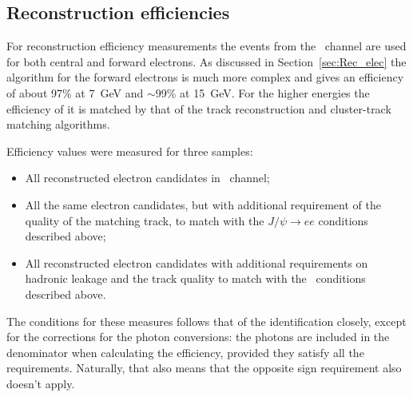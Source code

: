 \begin{figure}
\end{figure}


\subsection{Reconstruction efficiencies}

For reconstruction efficiency measurements the events from the \Zee\ channel are used for both central and forward electrons. As discussed in Section~\ref{sec:Rec_elec} the algorithm for the forward electrons is much more complex and gives an efficiency of about 97\% at 7~GeV and $\sim$99\% at 15~GeV. For the higher energies the efficiency of it is matched by that of the track reconstruction and cluster-track matching algorithms.

Efficiency values were measured for three samples:

\begin{itemize}
\item All reconstructed electron candidates in \Zee\ channel;
\item All the same electron candidates, but with additional requirement of the quality of the matching track, to match with the $J/\psi \to ee$ conditions described above;
\item All reconstructed electron candidates with additional requirements on hadronic leakage and the track quality to match with the \Wenu\ conditions described above.
\end{itemize}

The conditions for these measures follows that of the identification closely, except for the corrections for the photon conversions: the photons are included in the denominator when calculating the efficiency, provided they satisfy all the requirements. Naturally, that also means that the opposite sign requirement also doesn't apply.

